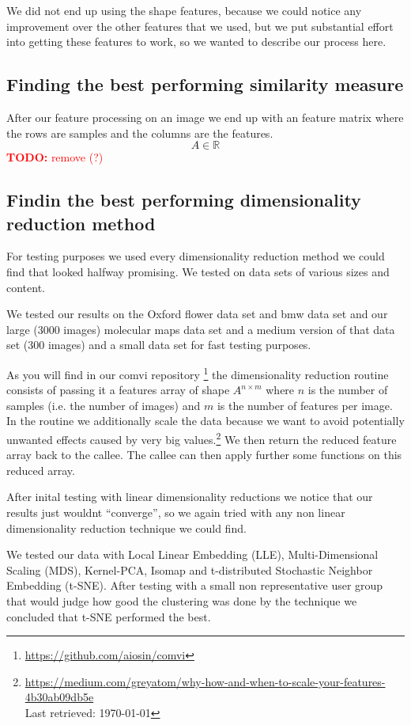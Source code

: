 \documentclass[journal]{vgtc}       %
\newcommand{\todo}[1]{\textcolor{red}{\textbf{TODO:} #1}}
\begin{document}
We did not end up using the shape features, because we could notice any improvement over the other features that we used, but we put substantial effort into getting these features to work, so we wanted to describe our process here.

\subsection{Finding the best performing similarity measure}

After our feature processing on an image we end up with an feature matrix where the rows are samples  and the columns are the features.  \[A \in \mathbb{R}\] \todo{remove (?) }


\subsection{Findin the best performing  dimensionality reduction method}
For testing purposes we used every dimensionality reduction method we could find that looked halfway promising. We tested on data sets of various sizes and content.

We tested our results on the Oxford flower data set and bmw data set and our large (3000 images) molecular maps data set and a medium version of that data set (300 images) and a small data set for fast testing purposes.

As you will find in our comvi repository \footnote{\url{https://github.com/aiosin/comvi}} the dimensionality reduction routine consists of passing it a features array of shape \(A^{n\times m}\) where \(n\) is the number of samples (i.e. the number of images) and \(m\) is the number of features per image.
In the routine we additionally scale the data because we want to avoid potentially unwanted effects caused by very big values.\footnote{\url{https://medium.com/greyatom/why-how-and-when-to-scale-your-features-4b30ab09db5e} \\ Last retrieved: \today}
We then return the reduced feature array back to the callee. The callee can then apply further some functions on this reduced array.

After inital testing with linear dimensionality reductions we notice that our results just wouldnt ``converge'', so we again tried with any non linear dimensionality reduction technique we could find.

We tested our data with Local Linear Embedding (LLE), Multi-Dimensional Scaling (MDS), Kernel-PCA, Isomap and t-distributed Stochastic Neighbor Embedding (t-SNE).
After testing with a small non representative user group that would judge how good the clustering was done by the technique we concluded that t-SNE performed the best.
\end{document}
